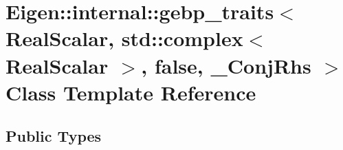 \hypertarget{class_eigen_1_1internal_1_1gebp__traits_3_01_real_scalar_00_01std_1_1complex_3_01_real_scalar_01f99740ceef5f07e0f3738974eb65d89c}{}\section{Eigen\+:\+:internal\+:\+:gebp\+\_\+traits$<$ Real\+Scalar, std\+:\+:complex$<$ Real\+Scalar $>$, false, \+\_\+\+Conj\+Rhs $>$ Class Template Reference}
\label{class_eigen_1_1internal_1_1gebp__traits_3_01_real_scalar_00_01std_1_1complex_3_01_real_scalar_01f99740ceef5f07e0f3738974eb65d89c}
\subsection*{Public Types}
